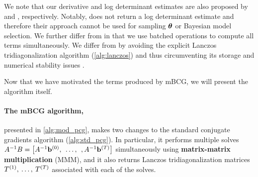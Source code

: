 \begin{enumerate}
\end{enumerate}
%
We note that our derivative and log determinant estimates are also proposed by \citet{cutajar2016preconditioning} and \citet{dong2017scalable}, respectively.
Notably, \citet{cutajar2016preconditioning} does not return a log determinant estimate and therefore their approach cannot be used for sampling $\boldsymbol{\theta}$ or Bayesian model selection.
We further differ from \citet{cutajar2016preconditioning} in that we use batched operations to compute all terms simultaneously.
We differ from \citet{dong2017scalable} by avoiding the explicit Lanczos tridiagonalization algorithm (\cref{alg:lanczos}) and thus circumventing its storage and numerical stability issues \cite{golub2012matrix}.

Now that we have motivated the terms produced by mBCG, we will present the algorithm itself.




\paragraph{The mBCG algorithm,} presented in \cref{alg:mod_pcg}, makes two changes to the standard conjugate gradients algorithm (\cref{alg:std_pcg}).
In particular, it performs multiple solves $A^{-1} B = \left[ A^{-1} \mathbf{b}^{(0)}, \:\: \ldots, \:\:, A^{-1} \mathbf{b}^{(T)} \right]$
simultaneously using {\bf matrix-matrix multiplication} (MMM), and it also returns Lanczos tridiagonalization matrices
$T^{(1)}, \: \ldots, \: T^{(T)}$
associated with each of the solves.

